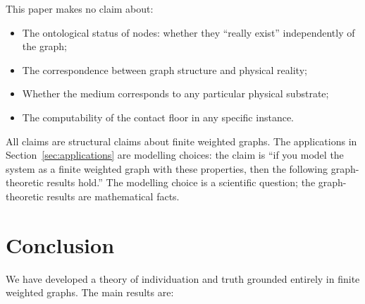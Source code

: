 \documentclass[12pt, a4paper]{article}
\theoremstyle{plain}
\theoremstyle{definition}
\theoremstyle{remark}
\begin{document}
This paper makes no claim about:
\begin{itemize}
  \item The ontological status of nodes: whether they ``really exist''
  independently of the graph;
  \item The correspondence between graph structure and physical reality;
  \item Whether the medium corresponds to any particular physical substrate;
  \item The computability of the contact floor in any specific instance.
\end{itemize}

All claims are structural claims about finite weighted graphs. The
applications in Section~\ref{sec:applications} are modelling choices:
the claim is ``if you model the system as a finite weighted graph with
these properties, then the following graph-theoretic results hold.'' The
modelling choice is a scientific question; the graph-theoretic results are
mathematical facts.

\section{Conclusion}
\label{sec:conclusion}

We have developed a theory of individuation and truth grounded entirely in
finite weighted graphs. The main results are:
\end{document}
